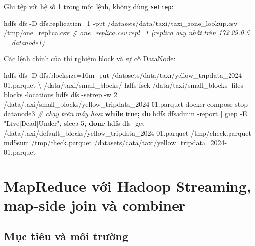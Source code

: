 \documentclass[
  12pt,
  a4paper,
]{report}
\newenvironment{Shaded}{}{}
\newcommand{\AttributeTok}[1]{\textcolor[rgb]{0.49,0.56,0.16}{#1}}
\newcommand{\CommentTok}[1]{\textcolor[rgb]{0.38,0.63,0.69}{\textit{#1}}}
\newcommand{\ControlFlowTok}[1]{\textcolor[rgb]{0.00,0.44,0.13}{\textbf{#1}}}
\newcommand{\DataTypeTok}[1]{\textcolor[rgb]{0.56,0.13,0.00}{#1}}
\newcommand{\ExtensionTok}[1]{#1}
\newcommand{\FunctionTok}[1]{\textcolor[rgb]{0.02,0.16,0.49}{#1}}
\newcommand{\KeywordTok}[1]{\textcolor[rgb]{0.00,0.44,0.13}{\textbf{#1}}}
\newcommand{\NormalTok}[1]{#1}
\newcommand{\StringTok}[1]{\textcolor[rgb]{0.25,0.44,0.63}{#1}}
\begin{document}
Ghi tệp với hệ số 1 trong một lệnh, không dùng \texttt{setrep}:

\begin{Shaded}
\begin{Highlighting}[]
\ExtensionTok{hdfs}\NormalTok{ dfs }\AttributeTok{{-}D}\NormalTok{ dfs.replication=1 }\AttributeTok{{-}put}\NormalTok{ /datasets/data/taxi/taxi\_zone\_lookup.csv /tmp/one\_replica.csv}
\CommentTok{\# one\_replica.csv repl=1   (replica duy nhất trên 172.29.0.5 = datanode1)}
\end{Highlighting}
\end{Shaded}

Các lệnh chính của thí nghiệm block và sự cố DataNode:

\begin{Shaded}
\begin{Highlighting}[]
\ExtensionTok{hdfs}\NormalTok{ dfs }\AttributeTok{{-}D}\NormalTok{ dfs.blocksize=16m }\AttributeTok{{-}put}\NormalTok{ /datasets/data/taxi/yellow\_tripdata\_2024{-}01.parquet }\DataTypeTok{\textbackslash{}}
\NormalTok{    /data/taxi/small\_blocks/}
\ExtensionTok{hdfs}\NormalTok{ fsck /data/taxi/small\_blocks }\AttributeTok{{-}files} \AttributeTok{{-}blocks} \AttributeTok{{-}locations}
\ExtensionTok{hdfs}\NormalTok{ dfs }\AttributeTok{{-}setrep} \AttributeTok{{-}w}\NormalTok{ 2 /data/taxi/small\_blocks/yellow\_tripdata\_2024{-}01.parquet}
\ExtensionTok{docker}\NormalTok{ compose stop datanode3          }\CommentTok{\# chạy trên máy host}
\ControlFlowTok{while} \FunctionTok{true}\KeywordTok{;} \ControlFlowTok{do} \ExtensionTok{hdfs}\NormalTok{ dfsadmin }\AttributeTok{{-}report} \KeywordTok{|} \FunctionTok{grep} \AttributeTok{{-}E} \StringTok{"Live|Dead|Under"}\KeywordTok{;} \FunctionTok{sleep}\NormalTok{ 5}\KeywordTok{;} \ControlFlowTok{done}
\ExtensionTok{hdfs}\NormalTok{ dfs }\AttributeTok{{-}get}\NormalTok{ /data/taxi/default\_blocks/yellow\_tripdata\_2024{-}01.parquet /tmp/check.parquet}
\FunctionTok{md5sum}\NormalTok{ /tmp/check.parquet /datasets/data/taxi/yellow\_tripdata\_2024{-}01.parquet}
\end{Highlighting}
\end{Shaded}

\chapter{MapReduce với Hadoop Streaming, map-side join và
combiner}\label{sec:l02}

\section{Mục tiêu và môi trường}\label{sec:l02-intro}
\end{document}
